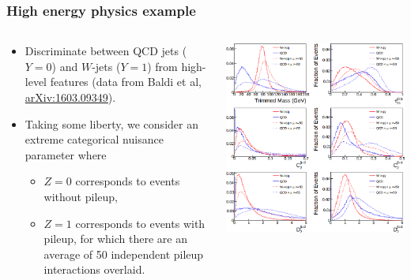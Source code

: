 \documentclass{beamer}
\begin{document}
\begin{frame}
    \frametitle{High energy physics example}


    \begin{columns}[t]
        \begin{column}{0.6\textwidth}
            \begin{itemize}
                \item Discriminate between QCD jets ($Y=0$) and $W$-jets ($Y=1$)
                from high-level features (data from Baldi et al, \href{http://arxiv.org/abs/1603.09349}{arXiv:1603.09349}).

                \vspace{0.5cm}

                \item Taking some liberty, we consider an extreme categorical nuisance parameter where
                \begin{itemize}
                    \item $Z=0$ corresponds to events without pileup,
                    \item $Z=1$ corresponds to events with pileup, for which there are
                    an average of 50 independent pileup interactions overlaid.
                \end{itemize}
            \end{itemize}
        \end{column}
        \begin{column}{0.45\textwidth}
            \begin{center}
                \includegraphics[width=\textwidth]{figures/jets.png}
            \end{center}
        \end{column}
    \end{columns}



\end{frame}
\end{document}
